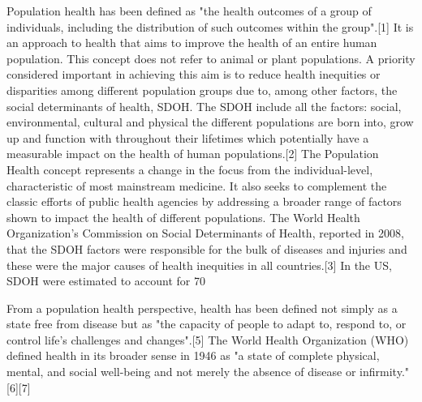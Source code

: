 Population health has been defined as "the health outcomes of a group of individuals, including the distribution of such outcomes within the group".[1] It is an approach to health that aims to improve the health of an entire human population. This concept does not refer to animal or plant populations. A priority considered important in achieving this aim is to reduce health inequities or disparities among different population groups due to, among other factors, the social determinants of health, SDOH. The SDOH include all the factors: social, environmental, cultural and physical the different populations are born into, grow up and function with throughout their lifetimes which potentially have a measurable impact on the health of human populations.[2] The Population Health concept represents a change in the focus from the individual-level, characteristic of most mainstream medicine. It also seeks to complement the classic efforts of public health agencies by addressing a broader range of factors shown to impact the health of different populations. The World Health Organization's Commission on Social Determinants of Health, reported in 2008, that the SDOH factors were responsible for the bulk of diseases and injuries and these were the major causes of health inequities in all countries.[3] In the US, SDOH were estimated to account for 70%
 
From a population health perspective, health has been defined not simply as a state free from disease but as "the capacity of people to adapt to, respond to, or control life's challenges and changes".[5] The World Health Organization (WHO) defined health in its broader sense in 1946 as "a state of complete physical, mental, and social well-being and not merely the absence of disease or infirmity."[6][7]
